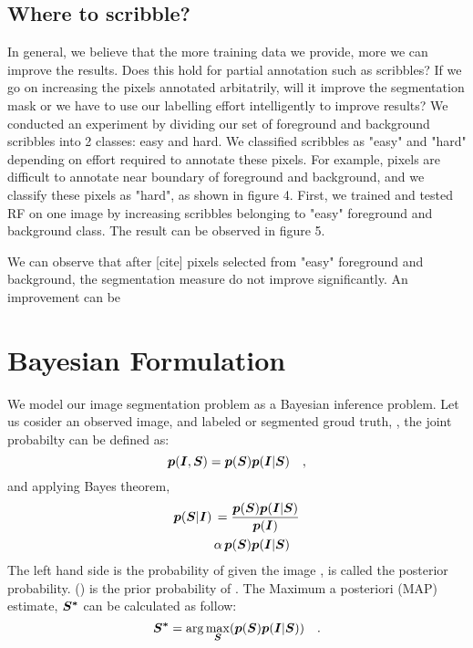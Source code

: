 \subsection{Where to scribble?}
In general, we believe that the more training data we provide, more we can improve the results. Does this hold for partial annotation such as scribbles? If we go on increasing the pixels annotated arbitatrily, will it improve the segmentation mask or we have to use our labelling effort intelligently to improve results? We conducted an experiment by dividing our set of foreground and background scribbles into 2 classes: easy and hard. We classified scribbles as "easy" and "hard" depending on effort required to annotate these pixels. For example, pixels are difficult to annotate near boundary of foreground and background, and we classify these pixels as "hard", as shown in figure 4. First, we trained and tested RF on one image by increasing scribbles belonging to "easy" foreground and background class. The result can be observed in figure 5. \par

We can observe that after [cite] pixels selected from "easy" foreground and background, the segmentation measure do not improve significantly. An improvement can be 

\section{Bayesian Formulation}
We model our image segmentation problem as a Bayesian inference problem.
Let us cosider an observed image,  and labeled or segmented groud truth, , the joint probabilty can be defined as:
\begin{equation*}
\boldsymbol{p}(\boldsymbol{I}, \boldsymbol{S}) = \boldsymbol{p}(\boldsymbol{S}) \boldsymbol{p}(\boldsymbol{I}|\boldsymbol{S}) \quad ,
\end{equation*}
and applying Bayes theorem,
\begin{align*}
\boldsymbol{p}(\boldsymbol{S}|\boldsymbol{I}) \, & = \frac{\boldsymbol{p}(\boldsymbol{S}) \boldsymbol{p}(\boldsymbol{I}|\boldsymbol{S})}{\boldsymbol{p}(\boldsymbol{I})} \\
						& \alpha \, {\boldsymbol{p}(\boldsymbol{S}) \boldsymbol{p}(\boldsymbol{I}|\boldsymbol{S})}
\end{align*}
The left hand side is the probability of  given the image , is called the
posterior probability. \p() is the prior probability of . The Maximum a posteriori (MAP) estimate, $\boldsymbol{S^*}$ can be calculated as follow:
\begin{equation}
\boldsymbol{S^*} = \arg\max_{\boldsymbol{S}}({\boldsymbol{p}(\boldsymbol{S}) \boldsymbol{p}(\boldsymbol{I}|\boldsymbol{S})}) \quad .
\end{equation}

